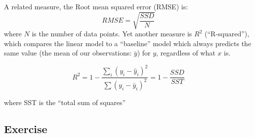 \documentclass[11pt]{article}
\begin{document}
A related measure, the Root mean squared error (RMSE) is:
\begin{equation}
    RMSE = \sqrt{\frac{SSD}{N}}
\end{equation}
where $N$ is the number of data points.
Yet another measure is $R^2$ (``R-squared''), which compares the linear
model to a ``baseline'' model which always predicts the same value (the
mean of our observations: $\bar{y}$) for $y$, regardless of what $x$ is.  

\begin{equation}
    R^2 = 
        1 - \frac{ \sum_i (y_i - \hat{y}_i)^2 }{ \sum (y_i - \bar{y}_i)^2} = 
        1 - \frac{ SSD }{ SST }
\end{equation}

where SST is the ``total sum of squares''

\subsection{Exercise}
\end{document}
